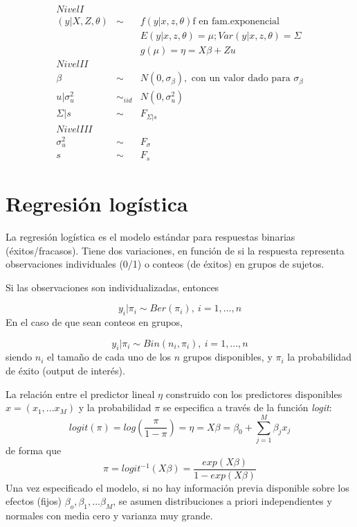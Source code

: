 \documentclass[
]{book}
\begin{document}
\begin{eqnarray*}
Nivel I &&\\
( y | X, Z, \theta) &\sim & f(y|x,z,\theta) \text{f en fam.exponencial}\\
&& E(y|x,z,\theta)=\mu; Var(y|x,z,\theta)=\Sigma \\
&& g(\mu)=\eta=X\beta + Z u \\
Nivel II &&\\
\beta &\sim & N(0,\sigma_{\beta}), \text{ con un valor dado  para } \sigma_{\beta} \\
u|\sigma_u^2 &\sim_{iid}&  N(0,{\sigma_u^2}) \\
\Sigma|s &\sim& F_{\Sigma|s} \\
Nivel III &&\\
\sigma_u^2 &\sim&  F_{\sigma} \\
s &\sim&  F_{s}
\end{eqnarray*}

\hypertarget{regresiuxf3n-loguxedstica}{%
\section{Regresión logística}\label{regresiuxf3n-loguxedstica}}

La regresión logística es el modelo estándar para respuestas binarias (éxitos/fracasos). Tiene dos variaciones, en función de si la respuesta representa observaciones individuales (0/1) o conteos (de éxitos) en grupos de sujetos.

Si las observaciones son individualizadas, entonces

\[y_i|\pi_i \sim Ber(\pi_i), \ i=1,...,n\]
En el caso de que sean conteos en grupos,

\[y_i|\pi_i\sim Bin(n_i,\pi_i), \ i=1,...,n\]
siendo \(n_i\) el tamaño de cada uno de los \(n\) grupos disponibles, y \(\pi_i\) la probabilidad de éxito (output de interés).

La relación entre el predictor lineal \(\eta\) construido con los predictores disponibles \(x=(x_{1},...x_{M})\) y la probabilidad \(\pi\) se especifica a través de la función \emph{logit}:
\[logit(\pi)=log\left(\frac{\pi}{1-\pi}\right)=\eta=X\beta=\beta_0+\sum_{j=1}^M \beta_j x_{j}\]
de forma que
\[\pi=logit^{-1}(X\beta)=\frac{exp(X\beta)}{1-exp(X\beta)}\]
Una vez especificado el modelo, si no hay información previa disponible sobre los efectos (fijos) \({\beta_o,\beta_1,...\beta_M}\), se asumen distribuciones a priori independientes y normales con media cero y varianza muy grande.
\end{document}

